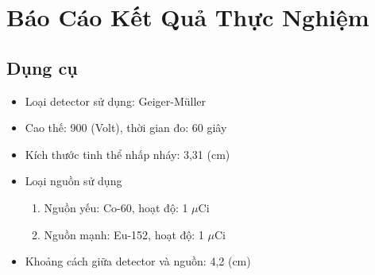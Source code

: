 \documentclass{article}
\begin{document}
\section*{\centering Báo Cáo Kết Quả Thực Nghiệm}
\vspace{1cm}

\setcounter{section}{1}
\subsection{Dụng cụ}
\begin{itemize}
	\item Loại detector sử dụng: Geiger-Müller
	\item Cao thế: 900 (Volt), thời gian đo: 60 giây
	\item Kích thước tinh thể nhấp nháy: 3,31 (cm)
	\item Loại nguồn sử dụng
		\begin{enumerate}
			\item Nguồn yếu: Co-60, hoạt độ: 1 $\mu$Ci
			\item Nguồn mạnh: Eu-152, hoạt độ: 1 $\mu$Ci
		\end{enumerate}
	\item Khoảng cách giữa detector và nguồn: 4,2 (cm)
\end{itemize}
\end{document}
